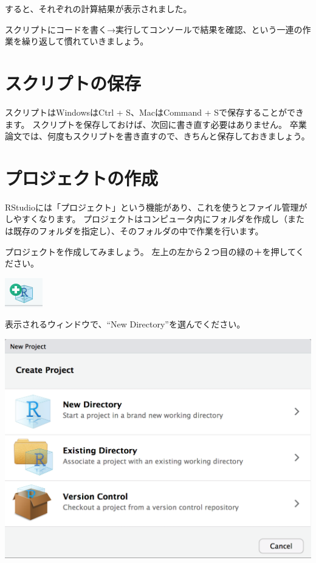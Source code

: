 \documentclass[
]{book}
\begin{document}
すると、それぞれの計算結果が表示されました。

スクリプトにコードを書く→実行してコンソールで結果を確認、という一連の作業を繰り返して慣れていきましょう。

\hypertarget{ux30b9ux30afux30eaux30d7ux30c8ux306eux4fddux5b58}{%
\section{スクリプトの保存}\label{ux30b9ux30afux30eaux30d7ux30c8ux306eux4fddux5b58}}

スクリプトはWindowsはCtrl + S、MacはCommand + Sで保存することができます。
スクリプトを保存しておけば、次回に書き直す必要はありません。
卒業論文では、何度もスクリプトを書き直すので、きちんと保存しておきましょう。

\hypertarget{ux30d7ux30edux30b8ux30a7ux30afux30c8ux306eux4f5cux6210}{%
\section{プロジェクトの作成}\label{ux30d7ux30edux30b8ux30a7ux30afux30c8ux306eux4f5cux6210}}

RStudioには「プロジェクト」という機能があり、これを使うとファイル管理がしやすくなります。
プロジェクトはコンピュータ内にフォルダを作成し（または既存のフォルダを指定し）、そのフォルダの中で作業を行います。

プロジェクトを作成してみましょう。
左上の左から２つ目の緑の＋を押してください。

\begin{center}\includegraphics[width=0.05\linewidth]{image/project1} \end{center}

表示されるウィンドウで、``New Directory''を選んでください。

\begin{center}\includegraphics[width=0.5\linewidth]{image/project2} \end{center}
\end{document}
